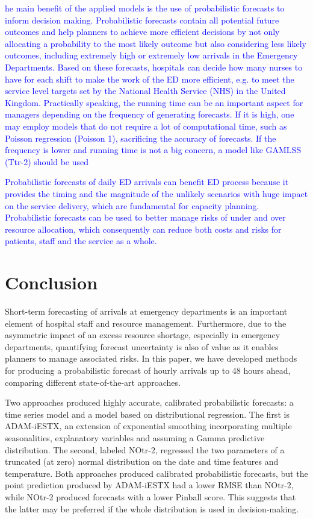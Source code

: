 \documentclass[]{elsarticle} %
\begin{document}
\textcolor{blue}{he main benefit of the applied models is the use of probabilistic forecasts to inform decision
making. Probabilistic forecasts contain all potential future outcomes and help planners to
achieve more efficient decisions by not only allocating a probability to the most likely outcome
but also considering less likely outcomes, including extremely high or extremely low arrivals
in the Emergency Departments. Based on these forecasts, hospitals can decide how many
nurses to have for each shift to make the work of the ED more efficient, e.g. to meet the
service level targets set by the National Health Service (NHS) in the United Kingdom.
Practically speaking, the running time can be an important aspect for managers depending
on the frequency of generating forecasts. If it is high, one may employ models that do not
require a lot of computational time, such as Poisson regression (Poisson 1), sacrificing the
accuracy of forecasts. If the frequency is lower and running time is not a big concern, a model
like GAMLSS (Ttr-2) should be used}

\textcolor{blue}{Probabilistic forecasts of daily ED arrivals can benefit ED process because it provides the timing and the magnitude of the unlikely scenarios with huge impact on the service delivery, which are fundamental for capacity planning. Probabilistic forecasts can be used to better manage risks of under and over resource allocation, which consequently can reduce both costs and risks for patients, staff and the service as a whole.}

\hypertarget{conclusion}{%
\section{Conclusion}\label{conclusion}}

Short-term forecasting of arrivals at emergency departments is an
important element of hospital staff and resource management.
Furthermore, due to the asymmetric impact of an excess resource
shortage, especially in emergency departments, quantifying forecast
uncertainty is also of value as it enables planners to manage associated
risks. In this paper, we have developed methods for producing a
probabilistic forecast of hourly arrivals up to 48 hours ahead,
comparing different state-of-the-art approaches.

Two approaches produced highly accurate, calibrated probabilistic
forecasts: a time series model and a model based on distributional
regression. The first is ADAM-iESTX, an extension of exponential
smoothing incorporating multiple seasonalities, explanatory variables
and assuming a Gamma predictive distribution. The second, labeled
NOtr-2, regressed the two parameters of a truncated (at zero) normal
distribution on the date and time features and temperature. Both
approaches produced calibrated probabilistic forecasts, but the point
prediction produced by ADAM-iESTX had a lower RMSE than NOtr-2, while
NOtr-2 produced forecasts with a lower Pinball score. This suggests that
the latter may be preferred if the whole distribution is used in
decision-making.
\end{document}
